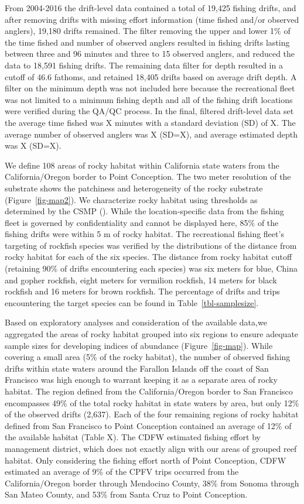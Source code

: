 \documentclass[
  12pt,
  authoryear,
  preprint,
  3p]{elsarticle}
\begin{document}
From 2004-2016 the drift-level data contained a total of 19,425 fishing
drifts, and after removing drifts with missing effort information (time
fished and/or observed anglers), 19,180 drifts remained. The filter
removing the upper and lower 1\% of the time fished and number of
observed anglers resulted in fishing drifts lasting between three and 96
minutes and three to 15 observed anglers, and reduced the data to 18,591
fishing drifts. The remaining data filter for depth resulted in a cutoff
of 46.6 fathoms, and retained 18,405 drifts based on average drift
depth. A filter on the minimum depth was not included here because the
recreational fleet was not limited to a minimum fishing depth and all of
the fishing drift locations were verified during the QA/QC process. In
the final, filtered drift-level data set the average time fished was X
minutes with a standard deviation (SD) of X. The average number of
observed anglers was X (SD=X), and average estimated depth was X (SD=X).

We define 108 areas of rocky habitat within California state waters from
the California/Oregon border to Point Conception. The two meter
resolution of the substrate shows the patchiness and heterogeneity of
the rocky substrate (Figure~\ref{fig-map2}). We characterize rocky
habitat using thresholds as determined by the CSMP
(\citet{CSUMB:2014:CSM}). While the location-specific data from the
fishing fleet is governed by confidentiality and cannot be displayed
here, 85\% of the fishing drifts were within 5 m of rocky habitat. The
recreational fishing fleet's targeting of rockfish species was verified
by the distributions of the distance from rocky habitat for each of the
six species. The distance from rocky habitat cutoff (retaining 90\% of
drifts encountering each species) was six meters for blue, China and
gopher rockfish, eight meters for vermilion rockfish, 14 meters for
black rockfish and 16 meters for brown rockfish. The percentage of
drifts and trips encountering the target species can be found in
Table~\ref{tbl-samplesize}.

Based on exploratory analyses and consideration of the available data,we
aggregated the areas of rocky habitat grouped into six regions to ensure
adequate sample sizes for developing indices of abundance
(Figure~\ref{fig-map}). While covering a small area (5\% of the rocky
habitat), the number of observed fishing drifts within state waters
around the Farallon Islands off the coast of San Francisco was high
enough to warrant keeping it as a separate area of rocky habitat. The
region defined from the California/Oregon border to San Francisco
encompasses 49\% of the total rocky habitat in state waters by area, but
only 12\% of the observed drifts (2,637). Each of the four remaining
regions of rocky habitat defined from San Francisco to Point Conception
contained an average of 12\% of the available habitat (Table X). The
CDFW estimated fishing effort by management district, which does not
exactly align with our areas of grouped reef habitat. Only considering
the fishing effort north of Point Conception, CDFW estimated an average
of 9\% of the CPFV trips occurred from the California/Oregon border
through Mendocino County, 38\% from Sonoma through San Mateo County, and
53\% from Santa Cruz to Point Conception.
\end{document}

